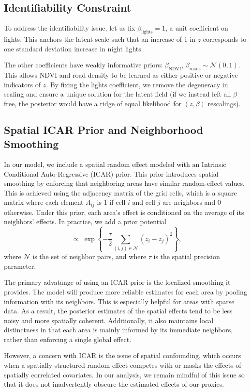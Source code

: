 \documentclass[12pt]{article}
\begin{document}
\subsection{Identifiability Constraint}
To address the identifiability issue, let us fix $\beta_{\text{lights}}=1$, a unit coefficient on lights. This anchors the latent scale such that an increase of 1 in $z$ corresponds to one standard deviation increase in night lights. 

The other coefficients have weakly informative priors: $\beta_{\text{NDVI}},\,\beta_{\text{roads}} \sim \mathcal N(0,1)$. This allows NDVI and road density to be learned as either positive or negative indicators of $z$. By fixing the lights coefficient, we remove the degeneracy in scaling and ensure a unique solution for the latent field (if we instead left all $\beta$ free, the posterior would have a ridge of equal likelihood for $(z, \beta)$ rescalings).


\subsection{Spatial ICAR Prior and Neighborhood Smoothing}

In our model, we include a spatial random effect modeled with an Intrinsic Conditional Auto-Regressive (ICAR) prior. This prior introduces spatial smoothing by enforcing that neighboring areas have similar random-effect values. This is achieved using the adjacency matrix of the grid cells, which is a square matrix where each element $A_{ij}$ is 1 if cell $i$ and cell $j$ are neighbors and 0 otherwise. Under this prior, each area's effect is conditioned on the average of its neighbors' effects. In practice, we add a prior potential
\[
\;\propto\;
\exp\!\left\{-\frac{\tau}{2}\sum_{(i,j)\in\mathcal N}(z_i-z_j)^2\right\},
\]
where $\mathcal N$ is the set of neighbor pairs, and where $\tau$ is the spatial precision parameter. 

The primary advatange of using an ICAR prior is the localized smoothing it provides. The model will produce more reliable estimates for each area by pooling information with its neighbors. This is especially helpful for areas with sparse data. As a result, the posterior estimates of the spatial effects tend to be less noisy and more spatially coherent. Additionally, it also maintains local distinctness in that each area is mainly informed by its immediate neighbors, rather than enforcing a single global effect.

However, a concern with ICAR is the issue of spatial confounding, which occurs when a spatially-structured random effect competes with or masks the effects of spatially correlated covariates. In our analysis, we remain mindful of this issue so that it does not inadvertently obscure the estimated effects of our proxies.
\end{document}
